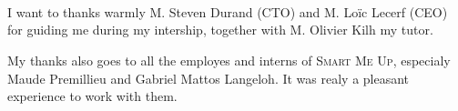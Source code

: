 \documentclass[a4paper,11pt]{custom}
\newcommand{\smu}{\textsc{Smart Me Up}}
\begin{document}
~
\thispagestyle{empty}

%
\headerleftcontent{\headerlefttext}%
\headerrightcontent{\headerrighttext}%
\myfootrulebegin[-.5cm]
\myfootruleend

~

\clearpage


~

\vspace{\fill}
\begin{flushright}
\begin{minipage}[b]{7cm}
I want to thanks warmly M. Steven Durand (CTO) and M. Loïc Lecerf (CEO) for
guiding me during my intership, together with M. Olivier Kilh my tutor.

\vspace{0.5em}

My thanks also goes to all the employes and interns of \smu, especialy Maude
Premillieu and Gabriel Mattos Langeloh. It was realy a pleasant experience to
work with them.
\end{minipage}
\end{flushright}
\vspace{\fill}
\vspace{\fill}


\newpage
~
\newpage

%
%
%
%
%
%
%
%
%


\end{document}
